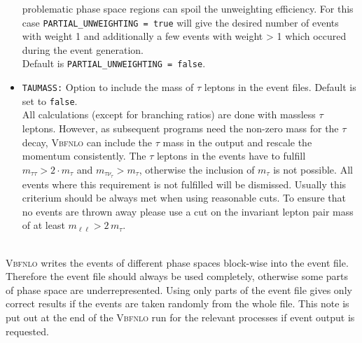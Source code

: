 \documentclass[english,12pt]{article}
\begin{document}
\begin{itemize}
  problematic phase space regions can spoil the unweighting efficiency. For this case
  {\tt PARTIAL\_UNWEIGHTING = true} will give the desired number of events with weight 1
  and additionally a few events with weight > 1 which occured during the event generation.\\
  Default is {\tt PARTIAL\_UNWEIGHTING = false}.
\item {\tt TAUMASS:} Option to include the mass of $\tau$ leptons in the event files. 
Default is set to {\tt false}.\\
All calculations (except for branching ratios) are done with massless $\tau$ leptons.
However, as subsequent programs need the non-zero mass for the $\tau$ decay, \textsc{Vbfnlo}
can include the $\tau$ mass in the output and rescale the momentum consistently.
The $\tau$ leptons in the events have to fulfill $m_{\tau\tau} > 2 \cdot m_\tau$ and 
$m_{\tau\nu_\tau} > m_\tau$, otherwise the inclusion of $m_\tau$ is not possible. 
All events where this requirement is not fulfilled will be dismissed. 
Usually this criterium should be always met when using reasonable cuts.
To ensure that no events are thrown away please use a cut on the invariant lepton pair mass
of at least $m_{\ell\ell} > 2 \, m_\tau$.
\end{itemize}

 \nopagebreak \\
\textsc{Vbfnlo} writes the events of different phase spaces block-wise into the event file.
Therefore the event file should always be used completely, otherwise some parts of phase
space are underrepresented. Using only parts of the event file gives only correct results
if the events are taken randomly from the whole file.
This note is put out at the end of the \textsc{Vbfnlo} run for the relevant processes
if event output is requested.

\end{document}
